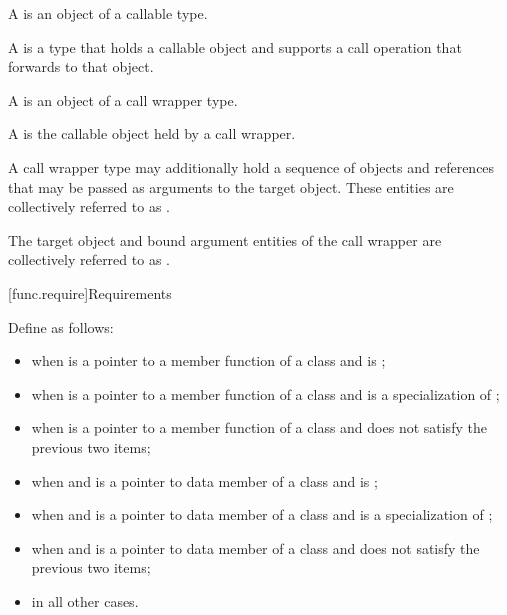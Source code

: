 \pnum
A  is an object of a callable type.

\pnum
A  is a type that holds a callable object
and supports a call operation that forwards to that object.

\pnum
A  is an object of a call wrapper type.

\pnum
A  is the callable object held by a call wrapper.

\pnum
A call wrapper type may additionally hold
a sequence of objects and references
that may be passed as arguments to the target object.
These entities are collectively referred to
as .

\pnum
The target object and bound argument entities of the call wrapper are
collectively referred to as .

[func.require]{Requirements}

\pnum
{}%
Define  as follows:
\begin{itemize}
\item {} when  is a pointer to a
member function of a class 
and  is ;

\item {} when  is a pointer to a
member function of a class 
and  is a specialization of ;

\item {} when  is a pointer to a
member function of a class 
and  does not satisfy the previous two items;

\item {} when  and  is a pointer to
data member of a class 
and  is ;

\item {} when  and  is a pointer to
data member of a class 
and  is a specialization of ;

\item {} when  and  is a pointer to
data member of a class 
and  does not satisfy the previous two items;

\item {} in all other cases.
\end{itemize}

